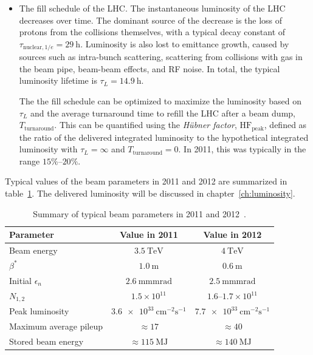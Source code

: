 \begin{itemize}
	\item The fill schedule of the LHC. The instantaneous luminosity of the LHC decreases over time. The dominant source of the decrease is the loss of protons from the collisions themselves, with a typical decay constant of $\tau_{\mathrm{nuclear},1/e}=\SI{29}{\hour}$. Luminosity is also lost to emittance growth, caused by sources such as intra-bunch scattering, scattering from collisions with gas in the beam pipe, beam-beam effects, and RF noise. In total, the typical luminosity lifetime is $\tau_L=\SI{14.9}{\hour}$. 

	The the fill schedule can be optimized to maximize the luminosity based on $\tau_L$ and the average turnaround time to refill the LHC after a beam dump, $T_{\mathrm{turnaround}}$. This can be quantified using the \emph{H{\"u}bner factor}, $\mathrm{HF}_{\mathrm{peak}}$, defined as the ratio of the delivered integrated luminosity to the hypothetical integrated luminosity with $\tau_L=\infty$ and $T_{\mathrm{turnaround}}=0$. In 2011, this was typically in the range $15\%$--$20\%$.
\end{itemize}

Typical values of the beam parameters in 2011 and 2012 are summarized in table~\ref{table:experiment-beam-parameters}. The delivered luminosity will be discussed in chapter~\ref{ch:luminosity}.

\begin{table}[htbp]
	\centering
	\begin{tabular}{lcc}
		\hline
		Parameter & Value in 2011 & Value in 2012 \\
		\hline
		Beam energy & $\SI{3.5}{\tera\electronvolt}$ & $\SI{4}{\tera\electronvolt}$ \\
		$\beta^*$ & $\SI{1.0}{\meter}$ & $\SI{0.6}{\meter}$ \\
		Initial $\epsilon_n$ & $\SI{2.6}{\milli\meter\milli\radian}$ & $\SI{2.5}{\milli\meter\milli\radian}$ \\
		$N_{1,2}$ & $1.5\times 10^{11}$ & $1.6$--$1.7\times10^{11}$ \\
		Peak luminosity & $\SI{3.6e33}{\centi\meter\tothe{-2}\second\tothe{-1}}$ & $\SI{7.7e33}{\centi\meter\tothe{-2}\second\tothe{-1}}$ \\
		Maximum average pileup & $\approx 17$ & $\approx 40$ \\
		Stored beam energy & $\approx\SI{115}{\mega\joule}$ & $\approx \SI{140}{\mega\joule}$ \\
	\end{tabular}
	\caption[Summary of typical beam parameters in 2011 and 2012.]{Summary of typical beam parameters in 2011 and 2012~\cite{Lamont:2013ca}.}
	\label{table:experiment-beam-parameters}
\end{table}



